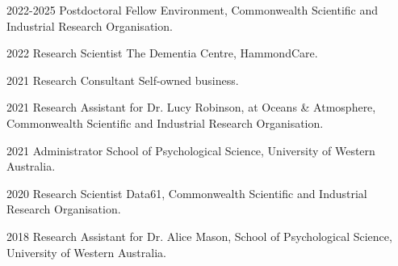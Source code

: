 

\begin{cvskills}

  \cvskill
    {2022-2025} %
    {Postdoctoral Fellow} %
    {Environment, Commonwealth Scientific and Industrial Research Organisation.} %

  \cvskill
    {2022} %
    {Research Scientist} %
    {The Dementia Centre, HammondCare.} %

  \cvskill
    {2021} %
    {Research Consultant} %
    {Self-owned business.} %

  \cvskill
    {2021} %
    {Research Assistant} %
    {for Dr. Lucy Robinson, at Oceans \& Atmosphere, Commonwealth Scientific and Industrial Research Organisation.} %

  \cvskill
    {2021} %
    {Administrator} %
    {School of Psychological Science, University of Western Australia.} %


  \cvskill
    {2020} %
    {Research Scientist} %
    {Data61, Commonwealth Scientific and Industrial Research Organisation.} %

  \cvskill
    {2018} %
    {Research Assistant} %
    {for Dr. Alice Mason, School of Psychological Science, University of Western Australia.} %

\end{cvskills}
